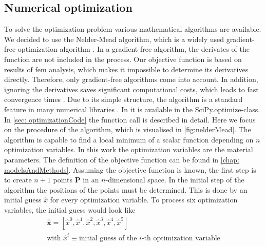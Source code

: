 \subsection{Numerical optimization} \label{subsec: numericalOptimization}
To solve the optimization problem various mathematical algorithms are available. We decided to use the Nelder-Mead algorithm, which is a widely used gradient-free optimization algorithm \cite{gao_implementing_2012}. In a gradient-free algorithm, the derivates of the function are not included in the process. Our objective function is based on results of \acrshort{fem} analysis, which makes it impossible to determine its derivatives directly. Therefore, only gradient-free algorithms come into account. In addition, ignoring the derivatives saves significant computational costs, which leads to fast convergence times \cite{pham_comparative_2011}. Due to its simple structure, the algorithm is a standard feature in many numerical libraries \cite{singer_efficient_2004}. In  it is available in the SciPy.optimize-class. In \autoref{sec: optimizationCode} the function call is described in detail. Here we focus on the procedure of the algorithm, which is visualised in \autoref{fig:nelderMead}. The algorithm is capable to find a local minimum of a scalar function depending on $n$ optimization variables. In this work the optimization variables are the material parameters. The definition of the objective function can be found in \autoref{chap: modelsAndMethods}. Assuming the objective function is known, the first step is to create $n+1$ points $\mathbf{P}$ in an $n$-dimensional space. In the initial step of the algorithm the positions of the points must be determined. This is done by an initial guess $\hat{x}$ for every optimization variable. To process six optimization variables, the initial guess would look like
\begin{gather*}
    \mathbf{\hat{x}} = [\hat{x}^0, \hat{x}^1, \hat{x}^2, \hat{x}^3, \hat{x}^4, \hat{x}^5] \\
    \text{with } \hat{x}^i \equiv \text{initial guess of the $i$-th optimization variable}
\end{gather*}

